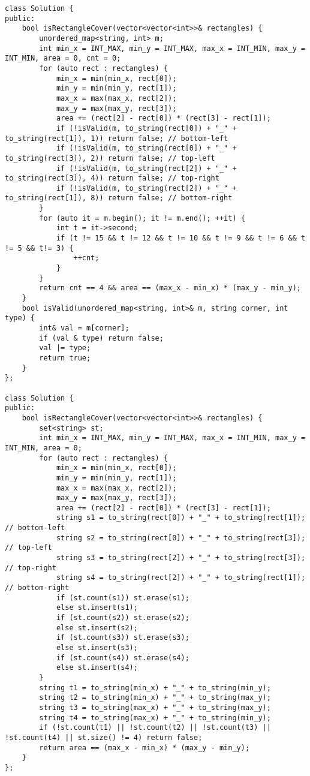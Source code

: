 \begin{lstlisting}
class Solution {
public:
    bool isRectangleCover(vector<vector<int>>& rectangles) {
        unordered_map<string, int> m;
        int min_x = INT_MAX, min_y = INT_MAX, max_x = INT_MIN, max_y = INT_MIN, area = 0, cnt = 0;
        for (auto rect : rectangles) {
            min_x = min(min_x, rect[0]);
            min_y = min(min_y, rect[1]);
            max_x = max(max_x, rect[2]);
            max_y = max(max_y, rect[3]);
            area += (rect[2] - rect[0]) * (rect[3] - rect[1]);
            if (!isValid(m, to_string(rect[0]) + "_" + to_string(rect[1]), 1)) return false; // bottom-left
            if (!isValid(m, to_string(rect[0]) + "_" + to_string(rect[3]), 2)) return false; // top-left
            if (!isValid(m, to_string(rect[2]) + "_" + to_string(rect[3]), 4)) return false; // top-right
            if (!isValid(m, to_string(rect[2]) + "_" + to_string(rect[1]), 8)) return false; // bottom-right
        }
        for (auto it = m.begin(); it != m.end(); ++it) {
            int t = it->second;
            if (t != 15 && t != 12 && t != 10 && t != 9 && t != 6 && t != 5 && t!= 3) {
                ++cnt;
            }
        }
        return cnt == 4 && area == (max_x - min_x) * (max_y - min_y);
    }
    bool isValid(unordered_map<string, int>& m, string corner, int type) {
        int& val = m[corner];
        if (val & type) return false;
        val |= type;
        return true;
    }
};

class Solution {
public:
    bool isRectangleCover(vector<vector<int>>& rectangles) {
        set<string> st;
        int min_x = INT_MAX, min_y = INT_MAX, max_x = INT_MIN, max_y = INT_MIN, area = 0;
        for (auto rect : rectangles) {
            min_x = min(min_x, rect[0]);
            min_y = min(min_y, rect[1]);
            max_x = max(max_x, rect[2]);
            max_y = max(max_y, rect[3]);
            area += (rect[2] - rect[0]) * (rect[3] - rect[1]);
            string s1 = to_string(rect[0]) + "_" + to_string(rect[1]); // bottom-left
            string s2 = to_string(rect[0]) + "_" + to_string(rect[3]); // top-left
            string s3 = to_string(rect[2]) + "_" + to_string(rect[3]); // top-right
            string s4 = to_string(rect[2]) + "_" + to_string(rect[1]); // bottom-right
            if (st.count(s1)) st.erase(s1);
            else st.insert(s1);
            if (st.count(s2)) st.erase(s2);
            else st.insert(s2);
            if (st.count(s3)) st.erase(s3);
            else st.insert(s3);
            if (st.count(s4)) st.erase(s4);
            else st.insert(s4);
        }
        string t1 = to_string(min_x) + "_" + to_string(min_y);
        string t2 = to_string(min_x) + "_" + to_string(max_y);
        string t3 = to_string(max_x) + "_" + to_string(max_y);
        string t4 = to_string(max_x) + "_" + to_string(min_y);
        if (!st.count(t1) || !st.count(t2) || !st.count(t3) || !st.count(t4) || st.size() != 4) return false;
        return area == (max_x - min_x) * (max_y - min_y);
    }
};
\end{lstlisting}

